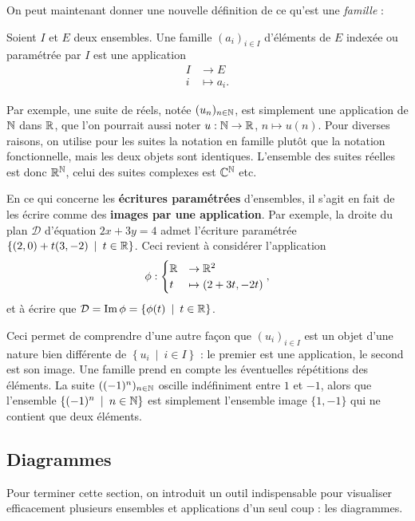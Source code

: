 On peut maintenant donner une nouvelle définition de ce qu'est une \emph{famille} :

\begin{definition}
Soient $I$ et $E$ deux ensembles. Une famille $(a_i)_{i\in I}$ d'éléments de $E$ indexée ou paramétrée par $I$ est une application
\begin{align*}
I&\to E\\ i&\mapsto a_i.
\end{align*}
\end{definition}

Par exemple, une suite de réels, notée $(u_n)_{n\in \mathbb{N}}$, est  simplement une application de $\mathbb{N}$ dans $\mathbb{R}$, que l'on pourrait aussi noter  $u : \mathbb{N}\to \mathbb{R}$, $n\mapsto u(n)$. Pour diverses raisons, on utilise pour les suites la notation en famille plutôt que la notation fonctionnelle, mais les deux objets sont identiques. L'ensemble des suites réelles est donc $\mathbb{R}^{\mathbb{N}}$, celui des suites complexes est $\mathbb{C}^{\mathbb{N}}$ etc.

En ce qui concerne les \textbf{écritures paramétrées} d'ensembles, il s'agit en fait de les écrire comme des \textbf{images par une application}. Par exemple, la droite du plan $\mathcal D$ d'équation $2x+3y=4$ admet l'écriture paramétrée $\{(2,0)+t(3,-2)\:\mid\: t\in \R\}$. Ceci revient à considérer l'application
\[ \phi:\begin{cases} \mathbb{R} &\to \mathbb{R}^2\\ t &\mapsto (2+3t,-2t)\end{cases}
,\]
et à écrire que $\mathcal D = \Im \phi  = \{\phi(t)\:\mid\: t\in \R\}$.

Ceci permet  de comprendre d'une autre façon que $\left(u_i\right)_{i\in I}$ est un objet d'une nature bien différente de $\left\{u_i\:\mid\: i\in I\right\}$ : le premier est une application, le second est son image. Une famille prend en compte les éventuelles \og répétitions\fg{} des éléments. La suite $((-1)^n)_{n\in \mathbb{N}}$ oscille indéfiniment entre $1$ et $-1$, alors que l'ensemble $\left\{(-1)^n\:\mid\: n\in \N\right\}$ est simplement l'ensemble image $\{1,-1\}$ qui ne contient que deux éléments.

\subsection{Diagrammes}

Pour terminer cette section, on introduit un outil indispensable pour visualiser efficacement plusieurs ensembles et applications d'un seul coup : les diagrammes.

